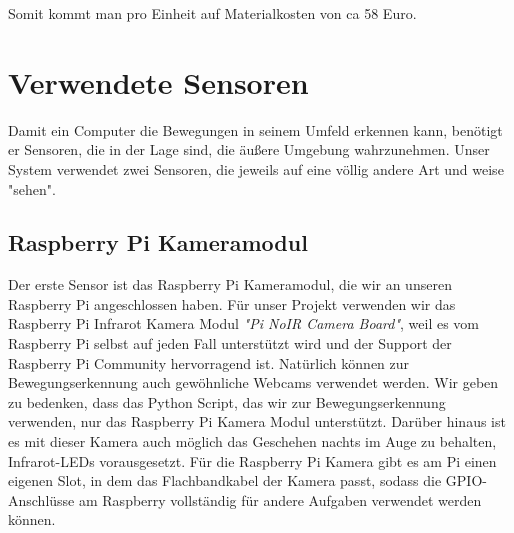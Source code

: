 \message{ !name(Verteilte Überwachung.tex)}\documentclass[12pt,a4paper]{scrreprt}
\begin{document}
Somit kommt man pro Einheit auf Materialkosten von ca 58 Euro.

\section{Verwendete Sensoren}
Damit ein Computer die Bewegungen in seinem Umfeld erkennen kann, benötigt er Sensoren, die in der Lage sind, die äußere Umgebung wahrzunehmen. Unser System verwendet zwei Sensoren, die jeweils auf eine völlig andere Art und weise "sehen". 

\subsection{Raspberry Pi Kameramodul}
Der erste Sensor ist das Raspberry Pi Kameramodul, die wir an unseren Raspberry Pi angeschlossen haben. Für unser Projekt verwenden wir das Raspberry Pi Infrarot Kamera Modul \textit{"Pi NoIR Camera Board"}, weil es vom Raspberry Pi selbst auf jeden Fall unterstützt wird und der Support der Raspberry Pi Community hervorragend ist. Natürlich können zur Bewegungserkennung auch gewöhnliche Webcams verwendet werden. Wir geben zu bedenken, dass das Python Script, das wir zur Bewegungserkennung verwenden, nur das Raspberry Pi Kamera Modul unterstützt. Darüber hinaus ist es mit dieser Kamera auch möglich das Geschehen nachts im Auge zu behalten, Infrarot-LEDs vorausgesetzt.
Für die Raspberry Pi Kamera gibt es am Pi einen eigenen Slot, in dem das Flachbandkabel der Kamera passt, sodass die GPIO-Anschlüsse am Raspberry vollständig für andere Aufgaben verwendet werden können.
\end{document}

